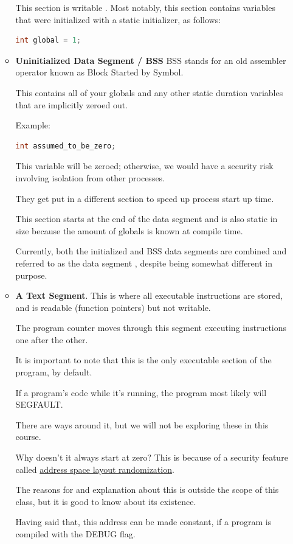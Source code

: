 \begin{itemize}
\begin{itemize}
          This section is writable \cite[P. 124]{van1994expert}.
          Most notably, this section contains variables that were initialized with a static initializer, as follows:

\begin{lstlisting}[language=C]
int global = 1;
\end{lstlisting}

    \item \textbf{Uninitialized Data Segment / BSS}
          BSS stands for an old assembler operator known as Block Started by Symbol.

          This contains all of your globals and any other static duration variables that are implicitly zeroed out.

          Example:
\begin{lstlisting}[language=C]
int assumed_to_be_zero;
\end{lstlisting}

          This variable will be zeroed; otherwise, we would have a security risk involving isolation from other processes.

          They get put in a different section to speed up process start up time.

          This section starts at the end of the data segment and is also static in size because the amount of globals is known at compile time.
          
          Currently, both the initialized and BSS data segments are combined and referred to as the data segment \cite[P. 124]{van1994expert}, despite being somewhat different in purpose.

    \item \textbf{A Text Segment}.
          This is where all executable instructions are stored, and is readable (function pointers) but not writable.

          The program counter moves through this segment executing instructions one after the other.

          It is important to note that this is the only executable section of the program, by default.

          If a program's code while it's running, the program most likely will SEGFAULT.

          There are ways around it, but we will not be exploring these in this course.

          Why doesn't it always start at zero?
          This is because of a security feature called \href{https://en.wikipedia.org/wiki/Address_space_layout_randomization}{address space layout randomization}.

          The reasons for and explanation about this is outside the scope of this class, but it is good to know about its existence.

          Having said that, this address can be made constant, if a program is compiled with the DEBUG flag.
\end{itemize}
\end{itemize}


